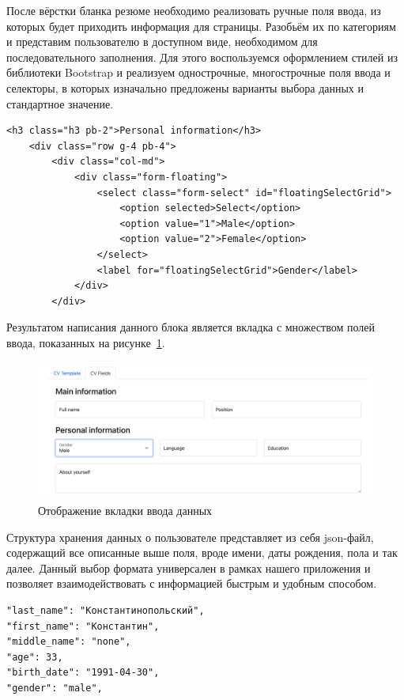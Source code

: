 \documentclass[master, och, diploma]{SCWorks}
\begin{document}
После вёрстки бланка резюме необходимо реализовать ручные поля ввода, из которых будет приходить информация для страницы. Разобьём их по категориям и представим пользователю в доступном виде, необходимом для последовательного заполнения. Для этого воспользуемся оформлением стилей из библиотеки Bootstrap и реализуем однострочные, многострочные поля ввода и селекторы, в которых изначально предложены варианты выбора данных и стандартное значение.
\begin{verbatim}
<h3 class="h3 pb-2">Personal information</h3>
    <div class="row g-4 pb-4">
        <div class="col-md">
            <div class="form-floating">
                <select class="form-select" id="floatingSelectGrid">
                    <option selected>Select</option>
                    <option value="1">Male</option>
                    <option value="2">Female</option>
                </select>
                <label for="floatingSelectGrid">Gender</label>
            </div>
        </div>
\end{verbatim}

Результатом написания данного блока является вкладка с множеством полей ввода, показанных на рисунке~\ref{fig:24}.
\begin{figure}[!ht]
    \centering
    \includegraphics[width=12cm]{images/image24.png}
    \caption{\label{fig:24}%
        Отображение вкладки ввода данных}
\end{figure}


Структура хранения данных о пользователе представляет из себя json-файл, содержащий все описанные выше поля, вроде имени, даты рождения, пола и так далее. Данный выбор формата универсален в рамках нашего приложения и позволяет взаимодействовать с информацией быстрым и удобным способом.
\begin{verbatim}
"last_name": "Константинопольский",
"first_name": "Константин",
"middle_name": "none",
"age": 33,
"birth_date": "1991-04-30",
"gender": "male",
\end{verbatim}
\end{document}
